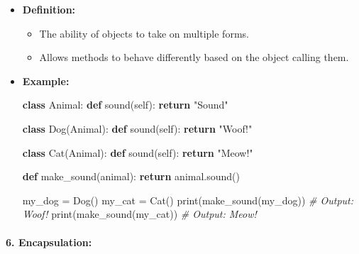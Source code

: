 \documentclass[11pt]{article}
\providecommand{\tightlist}{%
      \setlength{\itemsep}{0pt}\setlength{\parskip}{0pt}}
\newenvironment{Shaded}{}{}
\newcommand{\KeywordTok}[1]{\textcolor[rgb]{0.00,0.44,0.13}{\textbf{{#1}}}}
\newcommand{\StringTok}[1]{\textcolor[rgb]{0.25,0.44,0.63}{{#1}}}
\newcommand{\CommentTok}[1]{\textcolor[rgb]{0.38,0.63,0.69}{\textit{{#1}}}}
\newcommand{\NormalTok}[1]{{#1}}
\newcommand{\VariableTok}[1]{\textcolor[rgb]{0.10,0.09,0.49}{{#1}}}
\newcommand{\ControlFlowTok}[1]{\textcolor[rgb]{0.00,0.44,0.13}{\textbf{{#1}}}}
\newcommand{\OperatorTok}[1]{\textcolor[rgb]{0.40,0.40,0.40}{{#1}}}
\newcommand{\BuiltInTok}[1]{{#1}}
\begin{document}
\begin{itemize}
\item
  \textbf{Definition:}

  \begin{itemize}
  \tightlist
  \item
    The ability of objects to take on multiple forms.
  \item
    Allows methods to behave differently based on the object calling
    them.
  \end{itemize}
\item
  \textbf{Example:}

\begin{Shaded}
\begin{Highlighting}[]
\KeywordTok{class}\NormalTok{ Animal:}
    \KeywordTok{def}\NormalTok{ sound(}\VariableTok{self}\NormalTok{):}
        \ControlFlowTok{return} \StringTok{"Sound"}

\KeywordTok{class}\NormalTok{ Dog(Animal):}
    \KeywordTok{def}\NormalTok{ sound(}\VariableTok{self}\NormalTok{):}
        \ControlFlowTok{return} \StringTok{"Woof!"}

\KeywordTok{class}\NormalTok{ Cat(Animal):}
    \KeywordTok{def}\NormalTok{ sound(}\VariableTok{self}\NormalTok{):}
        \ControlFlowTok{return} \StringTok{"Meow!"}

\KeywordTok{def}\NormalTok{ make_sound(animal):}
    \ControlFlowTok{return}\NormalTok{ animal.sound()}

\NormalTok{my_dog }\OperatorTok{=}\NormalTok{ Dog()}
\NormalTok{my_cat }\OperatorTok{=}\NormalTok{ Cat()}
\BuiltInTok{print}\NormalTok{(make_sound(my_dog))  }\CommentTok{# Output: Woof!}
\BuiltInTok{print}\NormalTok{(make_sound(my_cat))  }\CommentTok{# Output: Meow!}
\end{Highlighting}
\end{Shaded}
\end{itemize}

\paragraph{\texorpdfstring{6.
\textbf{Encapsulation:}}{6. Encapsulation:}}\label{encapsulation}
\end{document}
